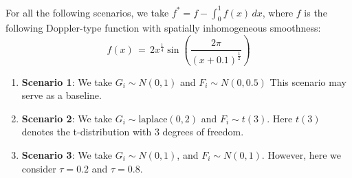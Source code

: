 \documentclass[twoside,11pt]{article}
\newcommand{\rev}[1]{{\color{revisionred}#1}}
\begin{document}
\rev{For all the following scenarios, we take \( f^* = f - \int_{0}^{1} f(x)\,dx \), where \(f\) is the following Doppler-type function with spatially inhomogeneous smoothness:}
\[
    f(x) \,=\, 
    2x^{\frac{1}{4}} \sin \left( \frac{2\pi}{(x+0.1)^{\frac{1}{2}}} \right)
\]




    

\begin{enumerate}
    
\item \textbf{Scenario 1}: We take $G_i\sim N(0, 1)$ and $F_i\sim N(0, 0.5)$ This scenario may serve as a baseline. 

\item \textbf{Scenario 2}: We take $G_i\sim \text{laplace}(0, 2)$ and $F_i\sim t(3)$. Here $t(3)$ denotes the t-distribution with 3 degrees of freedom. 

 

\item \textbf{Scenario 3}: We take $G_i\sim N(0, 1)$, and $F_i\sim N(0, 1)$. However, here we consider $\tau = 0.2$ and $\tau = 0.8$. 

\end{enumerate}
\end{document}
